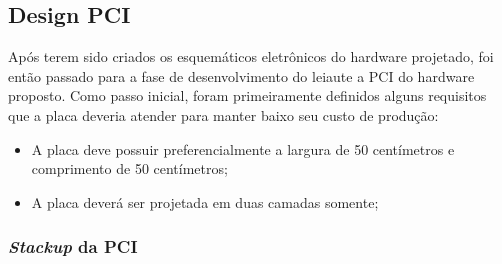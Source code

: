     \begin{figure}[h!]
            \captionsetup{width=10cm}
   \end{figure}  




\subsection{Design PCI}




Após terem sido criados os esquemáticos eletrônicos do hardware projetado, foi então passado para a fase de desenvolvimento do leiaute a \gls{PCI} do hardware proposto. Como passo inicial, foram primeiramente definidos alguns requisitos que a placa deveria atender para manter baixo seu custo de produção:

\begin{itemize}
    \item A placa deve possuir preferencialmente a largura de 50 centímetros e comprimento de 50 centímetros;
    
    \item A placa deverá ser projetada em duas camadas somente; 
\end{itemize}


\subsubsection{\textit{Stackup} da PCI}

